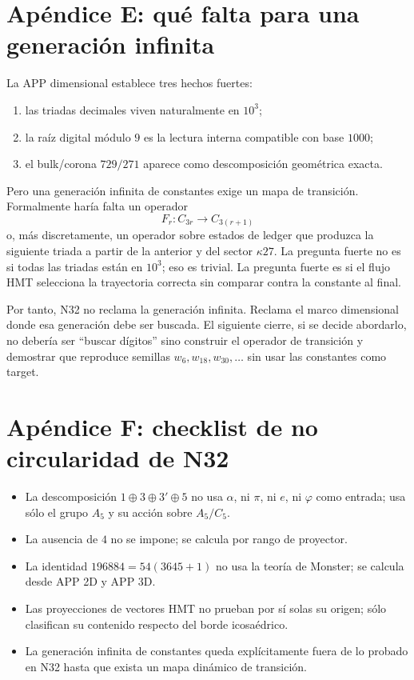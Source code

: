\documentclass[11pt,a4paper]{article}
\begin{document}
\section{Apéndice E: qué falta para una generación infinita}
La APP dimensional establece tres hechos fuertes:
\begin{enumerate}
\item las triadas decimales viven naturalmente en $10^3$;
\item la raíz digital módulo $9$ es la lectura interna compatible con base $1000$;
\item el bulk/corona $729/271$ aparece como descomposición geométrica exacta.
\end{enumerate}
Pero una generación infinita de constantes exige un mapa de transición. Formalmente haría falta un operador
\[
F_r:C_{3r}\to C_{3(r+1)}
\]
o, más discretamente, un operador sobre estados de ledger que produzca la siguiente triada a partir de la anterior y del sector $\kappa27$. La pregunta fuerte no es si todas las triadas están en $10^3$; eso es trivial. La pregunta fuerte es si el flujo HMT selecciona la trayectoria correcta sin comparar contra la constante al final.

Por tanto, N32 no reclama la generación infinita. Reclama el marco dimensional donde esa generación debe ser buscada. El siguiente cierre, si se decide abordarlo, no debería ser ``buscar dígitos'' sino construir el operador de transición y demostrar que reproduce semillas $w_6,w_{18},w_{30},\ldots$ sin usar las constantes como target.

\section{Apéndice F: checklist de no circularidad de N32}
\begin{itemize}
\item La descomposición $1\oplus3\oplus3'\oplus5$ no usa $\alpha$, ni $\pi$, ni $e$, ni $\varphi$ como entrada; usa sólo el grupo $A_5$ y su acción sobre $A_5/C_5$.
\item La ausencia de $4$ no se impone; se calcula por rango de proyector.
\item La identidad $196884=54(3645+1)$ no usa la teoría de Monster; se calcula desde APP 2D y APP 3D.
\item Las proyecciones de vectores HMT no prueban por sí solas su origen; sólo clasifican su contenido respecto del borde icosaédrico.
\item La generación infinita de constantes queda explícitamente fuera de lo probado en N32 hasta que exista un mapa dinámico de transición.
\end{itemize}
\end{document}

